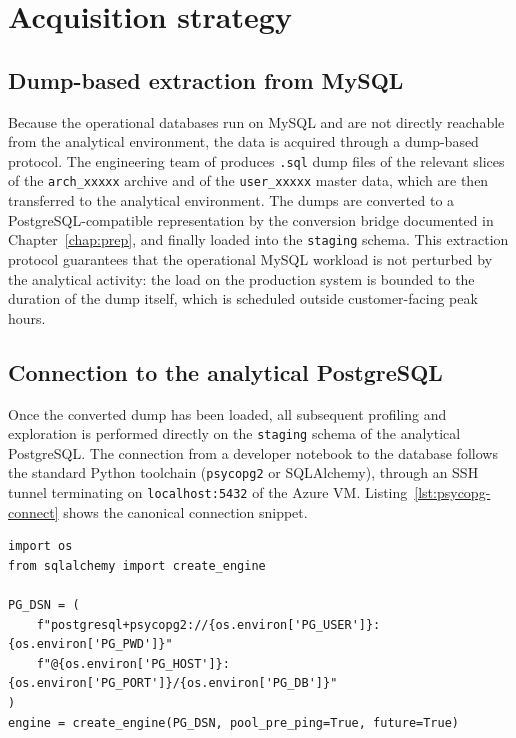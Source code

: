 \section{Acquisition strategy}

\subsection{Dump-based extraction from MySQL}
Because the operational databases run on MySQL and are not directly reachable from the analytical environment, the data is acquired through a dump-based protocol. The engineering team of \hostorg{} produces \texttt{.sql} dump files of the relevant slices of the \texttt{arch\_xxxxx} archive and of the \texttt{user\_xxxxx} master data, which are then transferred to the analytical environment. The dumps are converted to a PostgreSQL-compatible representation by the conversion bridge documented in Chapter~\ref{chap:prep}, and finally loaded into the \texttt{staging} schema. This extraction protocol guarantees that the operational MySQL workload is not perturbed by the analytical activity: the load on the production system is bounded to the duration of the dump itself, which is scheduled outside customer-facing peak hours.

\subsection{Connection to the analytical PostgreSQL}
Once the converted dump has been loaded, all subsequent profiling and exploration is performed directly on the \texttt{staging} schema of the analytical PostgreSQL. The connection from a developer notebook to the database follows the standard Python toolchain (\texttt{psycopg2} or SQLAlchemy), through an SSH tunnel terminating on \texttt{localhost:5432} of the Azure VM. Listing~\ref{lst:psycopg-connect} shows the canonical connection snippet.

\begin{lstlisting}[style=python,caption={Read-only connection from Python to the analytical PostgreSQL.},label={lst:psycopg-connect}]
import os
from sqlalchemy import create_engine

PG_DSN = (
    f"postgresql+psycopg2://{os.environ['PG_USER']}:{os.environ['PG_PWD']}"
    f"@{os.environ['PG_HOST']}:{os.environ['PG_PORT']}/{os.environ['PG_DB']}"
)
engine = create_engine(PG_DSN, pool_pre_ping=True, future=True)
\end{lstlisting}

